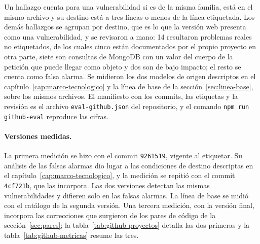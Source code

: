 Un hallazgo cuenta para una vulnerabilidad si es de la misma familia,
está en el mismo archivo y su destino está a tres líneas o menos de la
línea etiquetada. Los demás hallazgos se agrupan por destino, que es lo
que la versión web presenta como una vulnerabilidad, y se revisaron a
mano: 14 resultaron problemas reales no etiquetados, de los cuales cinco
están documentados por el propio proyecto en otra parte, siete son
consultas de MongoDB con un valor del cuerpo de la petición que puede
llegar como objeto y dos son de bajo impacto; el resto se cuenta como
falsa alarma. Se midieron los dos
modelos de origen descriptos en el capítulo~\ref{cap:marco-tecnologico}
y la línea de base de la sección~\ref{sec:linea-base}, sobre los mismos
archivos. El manifiesto con los commits, las etiquetas y la revisión es
el archivo \texttt{eval-github.json} del repositorio, y el comando
\texttt{npm run github-eval} reproduce las cifras.

\paragraph{Versiones medidas.} La primera medición se hizo con el commit
\texttt{9261519}, vigente al etiquetar. Su análisis de las falsas
alarmas dio lugar a las condiciones de destino descriptas en el
capítulo~\ref{cap:marco-tecnologico}, y la medición se repitió con el
commit \texttt{4cf721b}, que las incorpora. Las dos versiones detectan
las mismas vulnerabilidades y difieren solo en las falsas alarmas. La
línea de base se midió con el catálogo de la segunda versión. Una tercera
medición, con la versión final, incorpora las correcciones que surgieron
de los pares de código de la sección~\ref{sec:pares}; la
tabla~\ref{tab:github-proyectos} detalla las dos primeras y la
tabla~\ref{tab:github-metricas} resume las tres.


